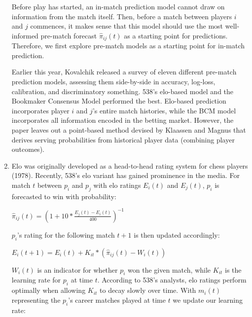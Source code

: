 \documentclass[11pt]{article}
\begin{document}
\begin{enumerate}

Before play has started, an in-match prediction model cannot draw on information from the match itself. Then, before a match between players $i$ and $j$ commences, it makes sense that this model should use the most well-informed pre-match forecast $\hat{\pi}_{ij}(t)$ as a starting point for predictions. Therefore, we first explore pre-match models as a starting point for in-match prediction.

Earlier this year, Kovalchik released a survey of eleven different pre-match prediction models, assessing them side-by-side in accuracy, log-loss, calibration, and discriminatory something. 538's elo-based model and the Bookmaker Consensus Model performed the best. Elo-based prediction incorporates player $i$ and $j$'s entire match histories, while the BCM model incorporates all information encoded in the betting market. However, the paper leaves out a point-based method  devised by Klaassen and Magnus that derives serving probabilities from historical player data (combining player outcomes).


\item Elo was originally developed as a head-to-head rating system for chess players (1978). Recently, 538's elo variant has gained prominence in the media. For match $t$ between $p_i$ and $p_j$ with elo ratings $E_i(t)$ and $E_j(t)$, $p_i$ is forecasted to win with probability:

$\hat{\pi}_{ij}(t) = (1 + 10*\frac{E_j(t)-E_i(t)}{400})^{-1}$


$p_i$'s rating for the following match $t+1$ is then updated accordingly:

$E_i(t+1) = E_i(t) + K_{it}*(\hat{\pi}_{ij}(t)-W_i(t))$

$W_i(t)$ is an indicator for whether $p_i$ won the given match, while $K_{it}$ is the learning rate for $p_i$ at time $t$. According to 538's analysts, elo ratings perform optimally when allowing $K_{it}$ to  decay slowly over time. With $m_i(t)$ representing the $p_i$'s career matches played at time $t$ we update our learning rate:


\end{enumerate}
\end{document}
